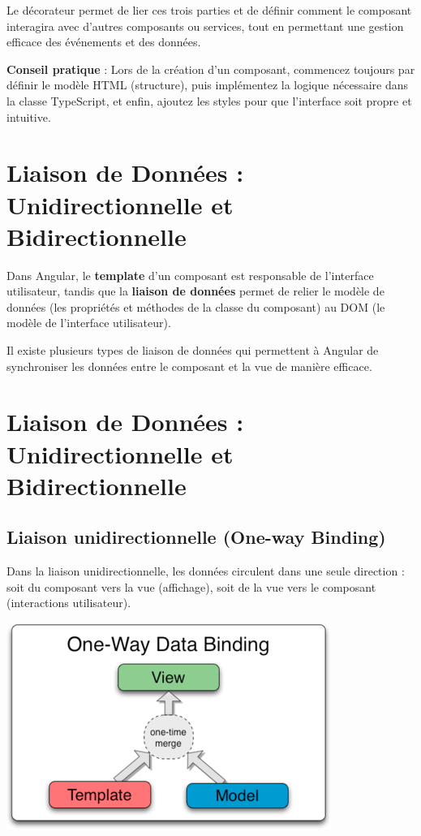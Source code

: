 \documentclass{article}
\begin{document}
Le décorateur \@Component permet de lier ces trois parties et de définir comment le composant interagira avec d’autres composants ou services, tout en permettant une gestion efficace des événements et des données.

\textbf{Conseil pratique} : Lors de la création d’un composant, commencez toujours par définir le modèle HTML (structure), puis implémentez la logique nécessaire dans la classe TypeScript, et enfin, ajoutez les styles pour que l’interface soit propre et intuitive.

\section{Liaison de Données : Unidirectionnelle et Bidirectionnelle}


Dans Angular, le \textbf{template} d’un composant est responsable de l’interface utilisateur, tandis que la \textbf{liaison de données} permet de relier le modèle de données (les propriétés et méthodes de la classe du composant) au DOM (le modèle de l'interface utilisateur). 

Il existe plusieurs types de liaison de données qui permettent à Angular de synchroniser les données entre le composant et la vue de manière efficace.

\section{Liaison de Données : Unidirectionnelle et Bidirectionnelle}

\subsection{Liaison unidirectionnelle (One-way Binding)}

Dans la liaison unidirectionnelle, les données circulent dans une seule direction : soit du composant vers la vue (affichage), soit de la vue vers le composant (interactions utilisateur).
\begin{tcolorbox}[colframe=black!70, colback=white, title=Figure 5: Liaison unidirectionnelle, fonttitle=\bfseries]
\centering
\includegraphics[width=\textwidth]{images/angularjs-one-way-data-binding.png}
\end{tcolorbox}
\end{document}
